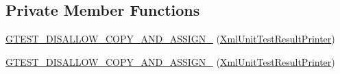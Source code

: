\subsection*{\-Private \-Member \-Functions}
\begin{DoxyCompactItemize}
\item 
\hyperlink{classtesting_1_1internal_1_1XmlUnitTestResultPrinter_a3369b39ed647f06785cf2d65b8d38b98}{\-G\-T\-E\-S\-T\-\_\-\-D\-I\-S\-A\-L\-L\-O\-W\-\_\-\-C\-O\-P\-Y\-\_\-\-A\-N\-D\-\_\-\-A\-S\-S\-I\-G\-N\-\_\-} (\hyperlink{classtesting_1_1internal_1_1XmlUnitTestResultPrinter}{\-Xml\-Unit\-Test\-Result\-Printer})
\item 
\hyperlink{classtesting_1_1internal_1_1XmlUnitTestResultPrinter_a3369b39ed647f06785cf2d65b8d38b98}{\-G\-T\-E\-S\-T\-\_\-\-D\-I\-S\-A\-L\-L\-O\-W\-\_\-\-C\-O\-P\-Y\-\_\-\-A\-N\-D\-\_\-\-A\-S\-S\-I\-G\-N\-\_\-} (\hyperlink{classtesting_1_1internal_1_1XmlUnitTestResultPrinter}{\-Xml\-Unit\-Test\-Result\-Printer})
\end{DoxyCompactItemize}
